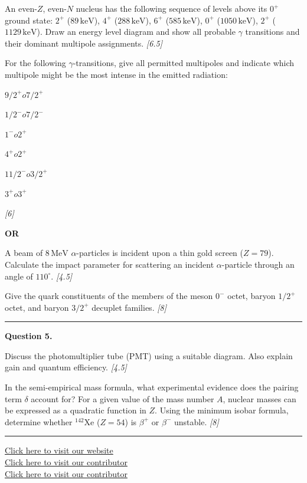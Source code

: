 \documentclass[11pt,a4paper]{article}
\newcommand{\pts}[1]{\hfill   \textit{[#1]}}
\begin{document}
\begin{parts}
  \item An even-$Z$, even-$N$ nucleus has the following sequence of levels above its $0^+$ ground state: $2^+$ ($89\, \text{keV}$), $4^+$ ($288\, \text{keV}$), $6^+$ ($585\, \text{keV}$), $0^+$ ($1050\, \text{keV}$), $2^+$ ($1129\, \text{keV}$). Draw an energy level diagram and show all probable $\gamma$ transitions and their dominant multipole assignments. \pts{6.5}
  \item For the following $\gamma$-transitions, give all permitted multipoles and indicate which multipole might be the most intense in the emitted radiation:
    
\begin{parts}
      \item $9/2^+  o 7/2^+$
      \item $1/2^-  o 7/2^-$
      \item $1^-  o 2^+$
      \item $4^+  o 2^+$
      \item $11/2^-  o 3/2^+$
      \item $3^+  o 3^+$
    \end{parts} \pts{6}
\end{parts}
\hfill   \textbf{OR}

\begin{parts}
  \item A beam of $8\, \text{MeV}$ $\alpha$-particles is incident upon a thin gold screen ($Z = 79$). Calculate the impact parameter for scattering an incident $\alpha$-particle through an angle of $110^\circ$. \pts{4.5}
  \item Give the quark constituents of the members of the meson $0^-$ octet, baryon $1/2^+$ octet, and baryon $3/2^+$ decuplet families. \pts{8}
\end{parts}

\medskip\rule{\linewidth}{0.2pt}




\noindent   \textbf{Question 5.}

\begin{parts}
  \item Discuss the photomultiplier tube (PMT) using a suitable diagram. Also explain gain and quantum efficiency. \pts{4.5}
  \item In the semi-empirical mass formula, what experimental evidence does the pairing term $\delta$ account for? For a given value of the mass number $A$, nuclear masses can be expressed as a quadratic function in $Z$. Using the minimum isobar formula, determine whether $^{142} \text{Xe}$ ($Z = 54$) is $\beta^+$ or $\beta^-$ unstable. \pts{8}
\end{parts}

\vfill
\rule{\linewidth}{0.4pt}

\begin{center}\small
  \href{https://bhu-exam.vercel.app/}{Click here to visit our website}\\[4pt]
  \href{https://me-aryan.vercel.app/}{Click here to visit our contributor}\\[4pt]
  \href{https://quashan-me.vercel.app/}{Click here to visit our contributor}
\end{center}
\end{document}
